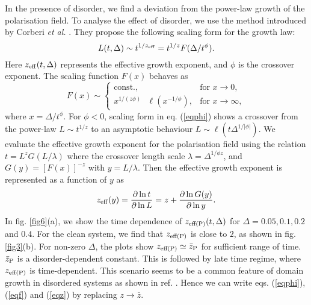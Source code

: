 \documentclass[pre,twocolumn,amssymb,showpacs,superscriptaddress,notitlepage]{revtex4-1}
\begin{document}
In the presence of disorder, we find a deviation from the power-law growth of the  polarisation field.
To analyse the effect of disorder, we use the method introduced by Corberi {\it et al.} \cite{equidis,purizannetti2011}. 
They propose the following scaling form for the growth law:
\begin{equation}
L(t, \Delta) \sim t^{1/z_{\rm eff}} = t^{1/{z}}F(\Delta/t^{\phi}).
\label{eqphi}
\end{equation}
Here $z_{\rm eff}(t,\Delta)$ represents the effective growth exponent, and $\phi$ is the crossover exponent. 
The scaling function $F(x)$ behaves as
\begin{equation}
F(x) \sim 
\begin{cases} 
\textrm{const.}, & \textrm{for } x \rightarrow 0, \\
x^{1/(z \phi )} \textrm{ } \ell \left( x^{-1/\phi} \right), & \textrm{for } x \rightarrow \infty,
\end{cases} 
\label{eqf}
\end{equation}
where $x=\Delta/t^{\phi}$.
For $\phi <0$, scaling form in eq. (\ref{eqphi}) shows a crossover from the power-law $L \sim t^{1/z}$ to an
asymptotic behaviour $L \sim \ell(t\Delta^{1/\lvert\phi\rvert})$. We evaluate the effective growth exponent
for the polarisation field using the relation $t=L^{z}G(L/\lambda)$ where the crossover length scale $\lambda = \Delta^{1/\phi z}$, 
and $G(y)=[F(x)]^{-z}$ with $y=L/\lambda$. Then the effective growth exponent is represented as a function of $y$ as
\begin{equation}
z_{\rm eff}(y) = \frac{\partial \ln t}{\partial \ln L} = z + \frac{\partial \ln G(y)}{\partial \ln y}.
\label{eqz}
\end{equation}
In fig. \ref{fig6}(a), we show the time dependence of $z_{\rm eff (P)}(t, \Delta)$ for $\Delta = 0.05, 0.1, 0.2$ and 
$0.4$. For the clean system, we find that $z_{\rm eff (P)}$ is close to $2$,  as shown in fig. \ref{fig3}(b). 
For non-zero $\Delta$, the plots show $z_{\rm eff (P)} \simeq \bar{z}_{\rm  P}$ for sufficient range of 
time. $\bar{z}_{\rm  P}$ is a disorder-dependent constant. This is followed by late time regime, where 
$z_{\rm eff (P)}$ is time-dependent. This  scenario seems to be a common feature of domain growth in disordered systems 
as shown in ref. \cite{equidis}. Hence we can write eqs. (\ref{eqphi}), (\ref{eqf}) and (\ref{eqz}) by replacing $z \rightarrow \bar{z}$.

\end{document}
